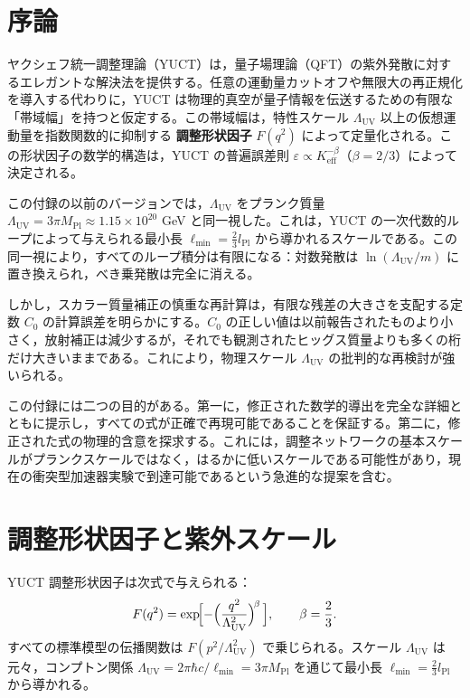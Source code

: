 \documentclass[11pt,a4paper]{article}
\newcommand{\Mpl}{M_{\mathrm{Pl}}}
\newcommand{\Lpl}{l_{\mathrm{Pl}}}
\newcommand{\Lmin}{\ell_{\min}}
\newcommand{\LUV}{\Lambda_{\mathrm{UV}}}
\theoremstyle{remark}
\begin{document}
	\vspace{0.5cm}
	
	\section{序論}
	\label{sec:intro}
	
	ヤクシェフ統一調整理論（YUCT）は，量子場理論（QFT）の紫外発散に対するエレガントな解決法を提供する。任意の運動量カットオフや無限大の再正規化を導入する代わりに，YUCT は物理的真空が量子情報を伝送するための有限な「帯域幅」を持つと仮定する。この帯域幅は，特性スケール \(\LUV\) 以上の仮想運動量を指数関数的に抑制する \textbf{調整形状因子} \(F(q^2)\) によって定量化される。この形状因子の数学的構造は，YUCT の普遍誤差則 \(\varepsilon \propto K_{\mathrm{eff}}^{-\beta}\)（\(\beta = 2/3\)）によって決定される。
	
	この付録の以前のバージョンでは，\(\LUV\) をプランク質量 \(\LUV = 3\pi\Mpl \approx 1.15\times 10^{20}\) GeV と同一視した。これは，YUCT の一次代数的ループによって与えられる最小長 \(\Lmin = \frac{2}{3}\Lpl\) から導かれるスケールである。この同一視により，すべてのループ積分は有限になる：対数発散は \(\ln(\LUV/m)\) に置き換えられ，べき乗発散は完全に消える。
	
	しかし，スカラー質量補正の慎重な再計算は，有限な残差の大きさを支配する定数 \(C_0\) の計算誤差を明らかにする。\(C_0\) の正しい値は以前報告されたものより小さく，放射補正は減少するが，それでも観測されたヒッグス質量よりも多くの桁だけ大きいままである。これにより，物理スケール \(\LUV\) の批判的な再検討が強いられる。
	
	この付録には二つの目的がある。第一に，修正された数学的導出を完全な詳細とともに提示し，すべての式が正確で再現可能であることを保証する。第二に，修正された式の物理的含意を探求する。これには，調整ネットワークの基本スケールがプランクスケールではなく，はるかに低いスケールである可能性があり，現在の衝突型加速器実験で到達可能であるという急進的な提案を含む。
	
	\section{調整形状因子と紫外スケール}
	\label{sec:formfactor}
	
	YUCT 調整形状因子は次式で与えられる：
	\begin{equation}
		F(q^2) = \exp\!\Bigl[-\Bigl(\frac{q^2}{\LUV^2}\Bigr)^{\!\beta}\,\Bigr], \qquad \beta = \frac{2}{3}.
		\label{eq:F}
	\end{equation}
	すべての標準模型の伝播関数は \(F(p^2/\LUV^2)\) で乗じられる。スケール \(\LUV\) は元々，コンプトン関係 \(\LUV = 2\pi\hbar c/\Lmin = 3\pi\Mpl\) を通じて最小長 \(\Lmin = \frac{2}{3}\Lpl\) から導かれる。
	
\end{document}
